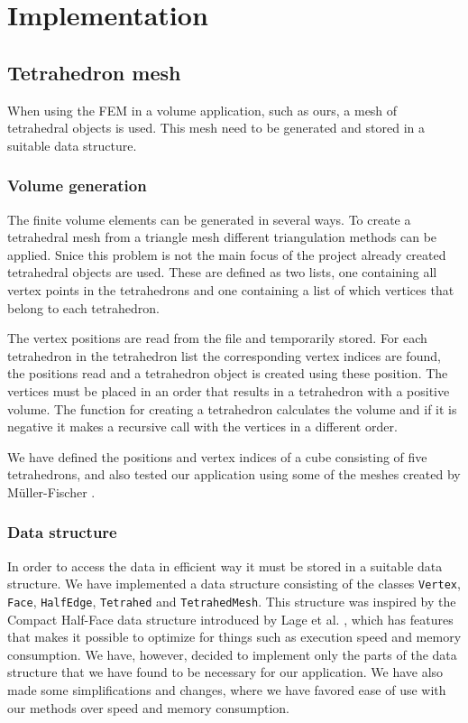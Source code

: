 \documentclass[10pt,a4paper]{article}
\begin{document}
\section{Implementation}


\subsection{Tetrahedron mesh}
When using the FEM in a volume application, such as ours, a mesh of tetrahedral objects is used. This mesh need to be generated and stored in a suitable data structure.

\subsubsection{Volume generation}
The finite volume elements can be generated in several ways. To create a tetrahedral mesh from a triangle mesh different triangulation methods can be applied. Snice this problem is not the main focus of the project already created tetrahedral objects are used. These are defined as two lists, one containing all vertex points in the tetrahedrons and one containing a list of which vertices that belong to each tetrahedron.

The vertex positions are read from the file and temporarily stored. For each tetrahedron in the tetrahedron list the corresponding vertex indices are found, the positions read and a tetrahedron object is created using these position. The vertices must be placed in an order that results in a tetrahedron with a positive volume. The function for creating a tetrahedron calculates the volume and if it is negative it makes a recursive call with the vertices in a different order.

We have defined the positions and vertex indices of a cube consisting of five tetrahedrons, and also tested our application using some of the meshes created by M\"uller-Fischer \cite{meshes}.


\subsubsection{Data structure}
In order to access the data in efficient way it must be stored in a suitable data structure. We have implemented a data structure consisting of the classes \texttt{Vertex}, \texttt{Face}, \texttt{HalfEdge}, \texttt{Tetrahed} and \texttt{TetrahedMesh}. This structure was inspired by the Compact Half-Face data structure introduced by Lage et al. \cite{halfface}, which has features that makes it possible to optimize for things such as execution speed and memory consumption. We have, however, decided to implement only the parts of the data structure that we have found to be necessary for our application. We have also made some simplifications and changes, where we have favored ease of use with our methods over speed and memory consumption.
\end{document}
